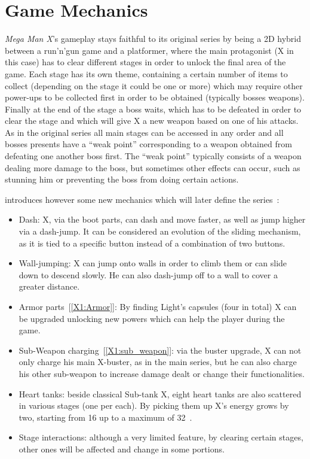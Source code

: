 \section{Game Mechanics}
\textit{Mega Man X}'s gameplay stays faithful to its original series by being a 2D hybrid between a run'n'gun game and a platformer, where the main protagonist (X in this case) has to clear different stages in order to unlock the final area of the game. Each stage has its own theme, containing a certain number of items to collect (depending on the stage it could be one or more) which may require other power-ups to be collected first in order to be obtained (typically bosses weapons). Finally at the end of the stage a boss waits, which has to be defeated in order to clear the stage and which will give X a new weapon based on one of his attacks. As in the original series all main stages can be accessed in any order and all bosses presents have a ``weak point'' corresponding to a weapon obtained from defeating one another boss first. The ``weak point'' typically consists of a weapon dealing more damage to the boss, but sometimes other effects can occur, such as stunning him or preventing the boss from doing certain actions.

\x introduces however some new mechanics which will later define the series~\cite{wiki:X1_features}:
\begin{itemize}
	\item Dash: X, via the boot parts, can dash and move faster, as well as jump higher via a dash-jump. It can be considered an evolution of the sliding mechanism, as it is tied to a specific button instead of a combination of two buttons.
	\item Wall-jumping: X can jump onto walls in order to climb them or can slide down to descend slowly. He can also dash-jump off to a wall to cover a greater distance.
	\item Armor parts~[\ref{X1:Armor}]: By finding Light's capsules (four in total) X can be upgraded unlocking new powers which can help the player during the game.
	\item Sub-Weapon charging~[\ref{X1:sub_weapon}]: via the buster upgrade, X can not only charge his main X-buster, as in the main series, but he can also charge his other sub-weapon to increase damage dealt or change their functionalities.
	\item Heart tanks: beside classical Sub-tank X, eight heart tanks are also scattered in various stages (one per each). By picking them up X's energy grows by two, starting from 16 up to a maximum of 32~\cite{stratwiki:Heart_tank}.
	\item Stage interactions: although a very limited feature, by clearing certain stages, other ones will be affected and change in some portions.
\end{itemize}

